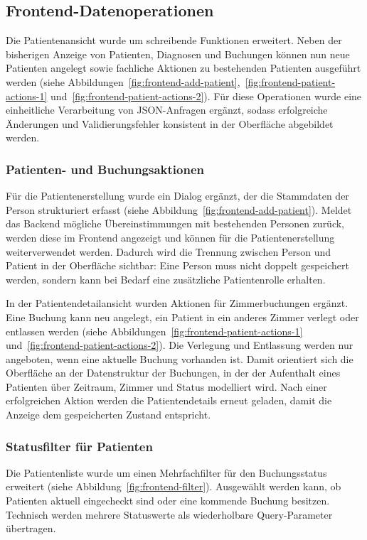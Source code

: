 \subsection{Frontend-Datenoperationen}

Die Patientenansicht wurde um schreibende Funktionen erweitert. Neben der bisherigen Anzeige von Patienten, Diagnosen und Buchungen können nun neue Patienten angelegt sowie fachliche Aktionen zu bestehenden Patienten ausgeführt werden (siehe Abbildungen~\ref{fig:frontend-add-patient},~\ref{fig:frontend-patient-actions-1} und~\ref{fig:frontend-patient-actions-2}). Für diese Operationen wurde eine einheitliche Verarbeitung von JSON-Anfragen ergänzt, sodass erfolgreiche Änderungen und Validierungsfehler konsistent in der Oberfläche abgebildet werden.

\subsubsection{Patienten- und Buchungsaktionen}

Für die Patientenerstellung wurde ein Dialog ergänzt, der die Stammdaten der Person strukturiert erfasst (siehe Abbildung~\ref{fig:frontend-add-patient}). Meldet das Backend mögliche Übereinstimmungen mit bestehenden Personen zurück, werden diese im Frontend angezeigt und können für die Patientenerstellung weiterverwendet werden. Dadurch wird die Trennung zwischen Person und Patient in der Oberfläche sichtbar: Eine Person muss nicht doppelt gespeichert werden, sondern kann bei Bedarf eine zusätzliche Patientenrolle erhalten.

In der Patientendetailansicht wurden Aktionen für Zimmerbuchungen ergänzt. Eine Buchung kann neu angelegt, ein Patient in ein anderes Zimmer verlegt oder entlassen werden (siehe Abbildungen~\ref{fig:frontend-patient-actions-1} und~\ref{fig:frontend-patient-actions-2}). Die Verlegung und Entlassung werden nur angeboten, wenn eine aktuelle Buchung vorhanden ist. Damit orientiert sich die Oberfläche an der Datenstruktur der Buchungen, in der der Aufenthalt eines Patienten über Zeitraum, Zimmer und Status modelliert wird. Nach einer erfolgreichen Aktion werden die Patientendetails erneut geladen, damit die Anzeige dem gespeicherten Zustand entspricht.

\subsubsection{Statusfilter für Patienten}

Die Patientenliste wurde um einen Mehrfachfilter für den Buchungsstatus erweitert (siehe Abbildung~\ref{fig:frontend-filter}). Ausgewählt werden kann, ob Patienten aktuell eingecheckt sind oder eine kommende Buchung besitzen. Technisch werden mehrere Statuswerte als wiederholbare Query-Parameter übertragen.

